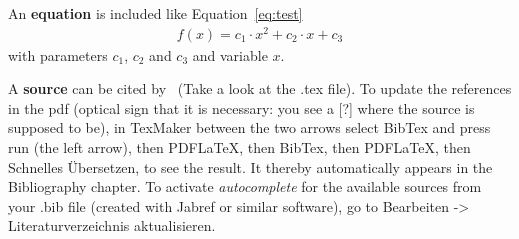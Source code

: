 An \textbf{equation} is included like Equation~\ref{eq:test}
\begin{align}
f(x) = c_1 \cdot x^2 + c_2 \cdot x + c_3
\end{align}\label{eq:test}
with parameters $c_1$, $c_2$ and $c_3$ and variable $x$.


A \textbf{source} can be cited by~\cite{NachnameNachname22016} (Take a look at the .tex file). To update the references in the pdf (optical sign that it is necessary: you see a [?] where the source is supposed to be), in TexMaker between the two arrows select BibTex and press run (the left arrow), then PDFLaTeX, then BibTex, then PDFLaTeX, then Schnelles Übersetzen, to see the result. It thereby automatically appears in the Bibliography chapter.
To activate \textit{autocomplete} for the available sources from your .bib file (created with Jabref or similar software), go to Bearbeiten -> Literaturverzeichnis aktualisieren.